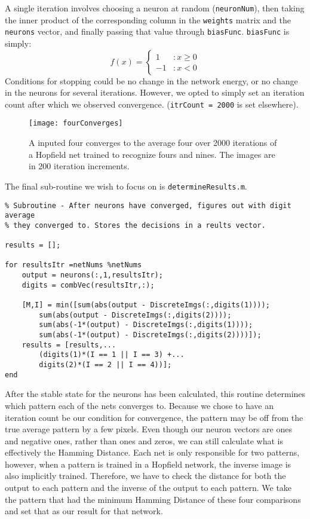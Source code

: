 \documentclass[]{article}
\theoremstyle{plain}
\theoremstyle{definition}
\begin{document}
A single iteration involves choosing a neuron at random (\texttt{neuronNum}), then taking the inner product of the corresponding column in the \texttt{weights} matrix and the \texttt{neurons} vector, and finally passing that value through \texttt{biasFunc}. \texttt{biasFunc} is simply:
\[ f(x) = \left\{\begin{array}{cc}
1 &: x \geq 0\\
-1 &: x < 0
\end{array}\right. \]
Conditions for stopping could be no change in the network energy, or no change in the neurons for several iterations. However, we opted to simply set an iteration count after which we observed convergence. (\texttt{itrCount = 2000} is set elsewhere).

\begin{figure}[h]
\centering
\texttt{[image: fourConverges]}
\caption{A inputed four converges to the average four over 2000 iterations of a Hopfield net trained to recognize fours and nines. The images are in 200 iteration increments.}
\end{figure}

\newpage

The final sub-routine we wish to focus on is \texttt{determineResults.m}.
\singlespacing
\begin{verbatim}
% Subroutine - After neurons have converged, figures out with digit average
% they converged to. Stores the decisions in a reults vector. 

results = []; 

for resultsItr =netNums %netNums
    output = neurons(:,1,resultsItr);
    digits = combVec(resultsItr,:);

    [M,I] = min([sum(abs(output - DiscreteImgs(:,digits(1))));
        sum(abs(output - DiscreteImgs(:,digits(2))));
        sum(abs(-1*(output) - DiscreteImgs(:,digits(1))));
        sum(abs(-1*(output) - DiscreteImgs(:,digits(2))))]);
    results = [results,...
        (digits(1)*(I == 1 || I == 3) +...
        digits(2)*(I == 2 || I == 4))]; 
end
\end{verbatim}
\doublespacing
\quad After the stable state for the neurons has been calculated, this routine determines which pattern each of the nets converges to. Because we chose to have an iteration count be our condition for convergence, the pattern may be off from the true average pattern by a few pixels. Even though our neuron vectors are ones and negative ones, rather than ones and zeros, we can still calculate what is effectively the Hamming Distance. Each net is only responsible for two patterns, however, when a pattern is trained in a Hopfield network, the inverse image is also implicitly trained. Therefore, we have to check the distance for both the output to each pattern and the inverse of the output to each pattern. We take the pattern that had the minimum Hamming Distance of these four comparisons and set that as our result for that network. 
\end{document}
